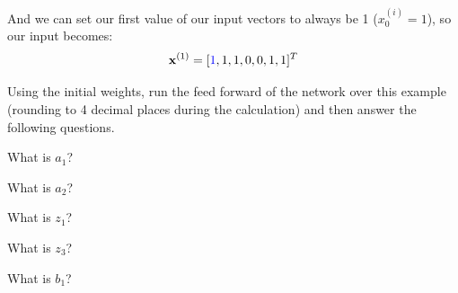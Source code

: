 \documentclass[11pt]{exam}
\numberwithin{equation}{section} %
\numberwithin{figure}{section} %
\numberwithin{table}{section} %
\newcommand{\xv}{\mathbf{x}}
\begin{document}
\begin{enumerate}
	    And we can set our first value of our input vectors to always be 1 ($x_0^{(i)} = 1$), so our input becomes: $$\xv^{(1)}=[\textcolor{blue}{1},1,1,0,0,1,1]^T$$
	    
	     Using the initial weights, run the feed forward of the network over this example (rounding to 4 decimal places during the calculation) and then answer the following questions. 
	    
	    \begin{questions}
	        \question[1] What is $a_1$?
	        
	        \begin{tcolorbox}[fit,height=1cm, width=2cm, blank, borderline={1pt}{-2pt}]
	        \end{tcolorbox}
	        
	        
	        \question[1] What is $a_2$?
	        
	        \begin{tcolorbox}[fit,height=1cm, width=2cm, blank, borderline={1pt}{-2pt}]
	        \end{tcolorbox}
	        
	        
	        
	        \question[1] What is $z_1$?
	        
	        \begin{tcolorbox}[fit,height=1cm, width=2cm, blank, borderline={1pt}{-2pt}]
	        \end{tcolorbox}
	        
	        
	        \question[1] What is $z_3$?
	        
	        \begin{tcolorbox}[fit,height=1cm, width=2cm, blank, borderline={1pt}{-2pt}]
	        \end{tcolorbox}
	        
	        
	        
	        \question[1] What is $b_1$?
	        
	        \begin{tcolorbox}[fit,height=1cm, width=2cm, blank, borderline={1pt}{-2pt}]
	        \end{tcolorbox}
	        

\end{questions}
\end{enumerate}
\end{document}
